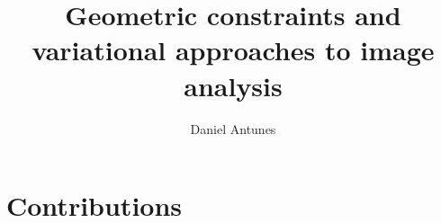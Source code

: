 \documentclass[a4paper,12pt]{book}
\begin{document}
	\title{Geometric constraints and variational approaches to image analysis}
	\author{Daniel Antunes}
	\date{}
	\maketitle

	
	

	
	\tableofcontents	
%	
%	
%	
%	
%	
%	
%	
	\part{Contributions}	
	
%	
%		
%	
%	
%		
%					
%		
	
\printbibliography
	
\end{document}
